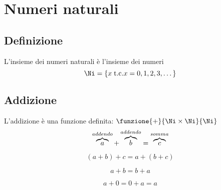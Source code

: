 
\chapter{Numeri naturali}\label{ch:numeri-naturali}
\section{Definizione}\label{sec:simbolo}
\begin{defn}
L'insieme dei numeri naturali è l'insieme dei numeri 
\begin{equation*}
\Ni=\lbrace x\; \text{t.c.}x=0,1,2,3,\dots \rbrace
\end{equation*}
\end{defn}
\section{Addizione}\label{sec:addizione}
\begin{defn}[Addizione]
L'addizione è una funzione definita:  $\funzione{+}{\Ni\times\Ni}{\Ni}$
\begin{equation*}\index{Numero!naturale!addizione}
\overbrace{a}^{addendo}+\overbrace{b}^{addendo}=\overbrace{c}^{somma}
\end{equation*}
\end{defn}
\begin{prop}[Associativa]
\begin{equation*}
(a+b)+c=a+(b+c)
\end{equation*}
\end{prop}
\begin{prop}[Commutativa]
\begin{equation*}
a+b=b+a
\end{equation*}
\end{prop}
\begin{prop}
\begin{equation*}
a+0=0+a=a
\end{equation*}
\end{prop}
